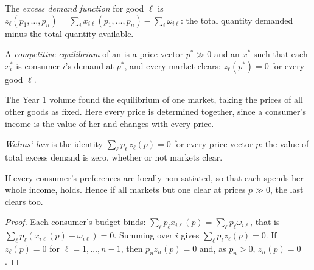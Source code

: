 \begin{definition}\label{def:b2:exchange-economies:excess-demand}
The \emph{excess demand function} for good $\ell$ is $z_\ell(p_1, \dots,
p_n) = \sum_i x_{i\ell}(p_1, \dots, p_n) - \sum_i \omega_{i\ell}$: the total quantity demanded minus the
total quantity available.
\end{definition}

\begin{definition}\label{def:b2:exchange-economies:competitive-equilibrium}
A \emph{competitive equilibrium} of an  is a
price vector $p^* \gg 0$ and an  $x^*$ such that each $x^*_i$ is consumer $i$'s demand at
$p^*$, and every market clears: $z_\ell(p^*) = 0$ for every good $\ell$.
\end{definition}

The Year 1 volume found the equilibrium of one market, taking the prices of all other goods as fixed.
Here every price is determined together, since a consumer's income is the value of her  and
changes with every price.

\begin{definition}\label{def:b2:exchange-economies:walras-law}
\emph{Walras' law} is the identity $\sum_\ell p_\ell\,z_\ell(p) = 0$ for every price
vector $p$: the value of total excess demand is zero, whether or not markets clear.
\end{definition}

\begin{proposition}\label{prop:b2:exchange-economies:walras}
If every consumer's preferences are locally non-satiated, so that each spends her whole income,
 holds. Hence if all markets but one clear at prices $p \gg 0$, the last clears too.
\end{proposition}

\begin{proof}
Each consumer's budget binds: $\sum_\ell p_\ell x_{i\ell}(p) = \sum_\ell p_\ell \omega_{i\ell}$, that is
$\sum_\ell p_\ell (x_{i\ell}(p) - \omega_{i\ell}) = 0$. Summing over $i$ gives $\sum_\ell p_\ell
z_\ell(p) = 0$. If $z_\ell(p) = 0$ for $\ell = 1, \dots, n - 1$, then $p_n z_n(p) = 0$ and, as $p_n > 0$,
$z_n(p) = 0$.
\end{proof}

